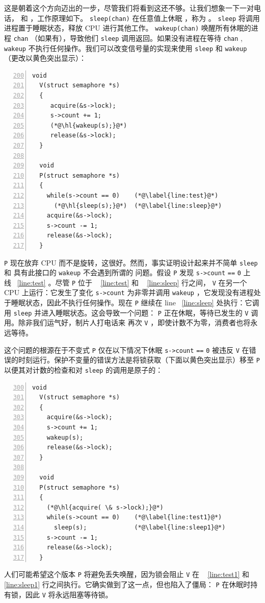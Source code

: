 这是朝着这个方向迈出的一步，尽管我们将看到这还不够。让我们想象一下一对电话，
        和
        ，工作原理如下。
    \lstinline{sleep(chan)}    在任意值上休眠
        ，称为
        。
    \lstinline{sleep}    将调用进程置于睡眠状态，释放 CPU 进行其他工作。
    \lstinline{wakeup(chan)}    唤醒所有休眠的进程
    \lstinline{chan}   （如果有），导致他们
    \lstinline{sleep}    调用返回。如果没有进程在等待
    \lstinline{chan}    ,
    \lstinline{wakeup}    不执行任何操作。我们可以改变信号量的实现来使用
    \lstinline{sleep}    和
    \lstinline{wakeup}   （更改以黄色突出显示）：
    \begin{lstlisting}[numbers=left,firstnumber=200]
  void
  V(struct semaphore *s)
  {
     acquire(&s->lock);
     s->count += 1;
     (*@\hl{wakeup(s);}@*)
     release(&s->lock);
  }
  
  void
  P(struct semaphore *s)
  {
    while(s->count == 0)    (*@\label{line:test}@*)
      (*@\hl{sleep(s);}@*)  (*@\label{line:sleep}@*)
    acquire(&s->lock);
    s->count -= 1;
    release(&s->lock);
  }
\end{lstlisting}     

   \lstinline{P}    现在放弃 CPU 而不是旋转，这很好。然而，事实证明设计起来并不简单
    \lstinline{sleep}    和
 具有此接口的    \lstinline{wakeup}    不会遇到所谓的        问题。假设
    \lstinline{P}    发现
    \lstinline{s->count}   
    \lstinline{==}   
    \lstinline{0}    上线~    \ref{line:test}    。尽管
    \lstinline{P}    位于 ~    \ref{line:test}    和 ~    \ref{line:sleep}    行之间，
    \lstinline{V}    在另一个 CPU 上运行：它发生了变化
    \lstinline{s->count}    为非零并调用
    \lstinline{wakeup}    ，它发现没有进程处于睡眠状态，因此不执行任何操作。现在
    \lstinline{P}    继续在 line~    \ref{line:sleep}    处执行：它调用
    \lstinline{sleep}    并进入睡眠状态。这会导致一个问题：
    \lstinline{P}    正在休眠，等待已发生的    \lstinline{V}    调用。除非我们运气好，制片人打电话来
 再次    \lstinline{V}   ，即使计数不为零，消费者也将永远等待。  

这个问题的根源在于不变式
    \lstinline{P}    仅在以下情况下休眠
    \lstinline{s->count}   
    \lstinline{==}   
    \lstinline{0}    被违反
    \lstinline{V}    在错误的时刻运行。保护不变量的错误方法是将锁获取（下面以黄色突出显示）移至
    \lstinline{P}    以便其对计数的检查和对    \lstinline{sleep}    的调用是原子的：
    \begin{lstlisting}[numbers=left,firstnumber=300]
  void
  V(struct semaphore *s)
  {
    acquire(&s->lock);
    s->count += 1;
    wakeup(s);
    release(&s->lock);
  }
  
  void
  P(struct semaphore *s)
  {
    (*@\hl{acquire( \& s->lock);}@*)
    while(s->count == 0)    (*@\label{line:test1}@*)
      sleep(s);             (*@\label{line:sleep1}@*)
    s->count -= 1;
    release(&s->lock);
  }
\end{lstlisting}    人们可能希望这个版本
    \lstinline{P}    将避免丢失唤醒，因为锁会阻止
    \lstinline{V}    在 ~    \ref{line:test1}    和 ~    \ref{line:sleep1}    行之间执行。它确实做到了这一点，但也陷入了僵局：
    \lstinline{P}    在休眠时持有锁，因此    \lstinline{V}    将永远阻塞等待锁。  

